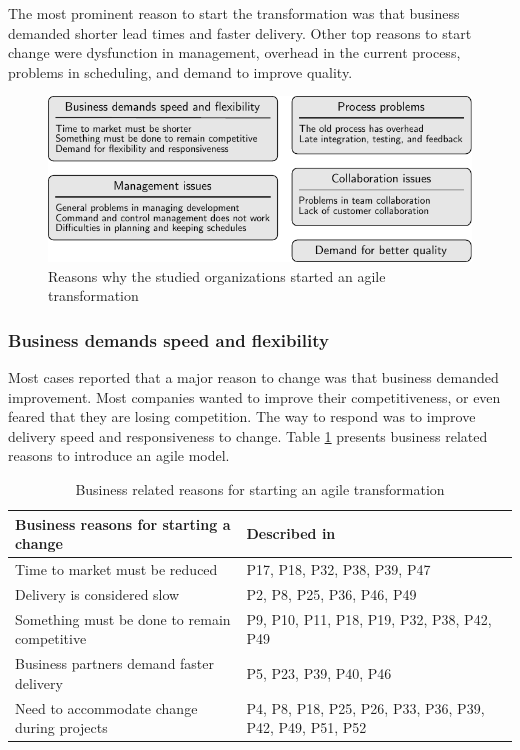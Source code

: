 The most prominent reason to start the transformation was that business demanded
shorter lead times and faster delivery. Other top reasons to start change were
dysfunction in management, overhead in the current process, problems in
scheduling, and demand to improve quality.


\begin{figure}[h]
  \begin{center}
    \includegraphics{graphics/reasonstochange_summary.pdf}
    \caption{Reasons why the studied organizations started an agile
             transformation}
    \label{fig:reasonstochange_summary}
  \end{center}
\end{figure}

\subsubsection{Business demands speed and flexibility}

Most cases reported that a major reason to change was that business demanded
improvement. Most companies wanted to improve their competitiveness, or even
feared that they are losing competition. The way to respond was to improve
delivery speed and responsiveness to change. Table
\ref{table:reasonstochange_business} presents business related reasons to
introduce an agile model.

\begin{table}
    \centering
    \begin{tabular}{ >{\raggedright\arraybackslash}p{}
                     >{\raggedright\arraybackslash}p{} }
        \toprule
        Business reasons for starting a change   &  Described in  \\
        \midrule
        Time to market must be reduced    &  P17, P18, P32, P38, P39, P47  \\
        Delivery is considered slow       &  P2, P8, P25, P36, P46, P49  \\
        Something must be done to remain competitive  &
                P9, P10, P11, P18, P19, P32, P38, P42, P49  \\
        Business partners demand faster delivery  &  P5, P23, P39, P40, P46  \\
        Need to accommodate change during projects  &
                P4, P8, P18, P25, P26, P33, P36, P39, P42, P49, P51, P52  \\
        \bottomrule
    \end{tabular}
    \caption{Business related reasons for starting an agile transformation}
    \label{table:reasonstochange_business}
\end{table}

